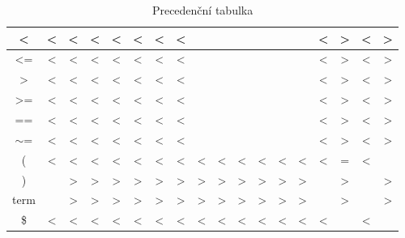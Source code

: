 \documentclass[11pt,a4paper]{article}
\begin{document}
\begin{table}[h!]
\begin{tabular}{|c|c|c|c|c|c|c|c|c|c|c|c|c|c|c|c|c|c|}
            \textless{} & \textless{} & \textless{} & \textless{} & \textless{} & \textless{} & \textless{} & \textless{} &  &  &  &  &  &  & \textless{} & \textgreater{} & \textless{} & \textgreater{} \\ \hline
            \textless{}= & \textless{} & \textless{} & \textless{} & \textless{} & \textless{} & \textless{} & \textless{} &  &  &  &  &  &  & \textless{} & \textgreater{} & \textless{} & \textgreater{} \\ \hline
            \textgreater{} & \textless{} & \textless{} & \textless{} & \textless{} & \textless{} & \textless{} & \textless{} &  &  &  &  &  &  & \textless{} & \textgreater{} & \textless{} & \textgreater{} \\ \hline
            \textgreater{}= & \textless{} & \textless{} & \textless{} & \textless{} & \textless{} & \textless{} & \textless{} &  &  &  &  &  &  & \textless{} & \textgreater{} & \textless{} & \textgreater{} \\ \hline
            == & \textless{} & \textless{} & \textless{} & \textless{} & \textless{} & \textless{} & \textless{} &  &  &  &  &  &  & \textless{} & \textgreater{} & \textless{} & \textgreater{} \\ \hline
            $\sim$= & \textless{} & \textless{} & \textless{} & \textless{} & \textless{} & \textless{} & \textless{} &  &  &  &  &  &  & \textless{} & \textgreater{} & \textless{} & \textgreater{} \\ \hline
            ( & \textless{} & \textless{} & \textless{} & \textless{} & \textless{} & \textless{} & \textless{} & \textless{} & \textless{} & \textless{} & \textless{} & \textless{} & \textless{} & \textless{} & = & \textless{} &  \\ \hline
            ) &  & \textgreater{} & \textgreater{} & \textgreater{} & \textgreater{} & \textgreater{} & \textgreater{} & \textgreater{} & \textgreater{} & \textgreater{} & \textgreater{} & \textgreater{} & \textgreater{} &  & \textgreater{} &  & \textgreater{} \\ \hline
            term &  & \textgreater{} & \textgreater{} & \textgreater{} & \textgreater{} & \textgreater{} & \textgreater{} & \textgreater{} & \textgreater{} & \textgreater{} & \textgreater{} & \textgreater{} & \textgreater{} &  & \textgreater{} &  & \textgreater{} \\ \hline
            \$ & \textless{} & \textless{} & \textless{} & \textless{} & \textless{} & \textless{} & \textless{} & \textless{} & \textless{} & \textless{} & \textless{} & \textless{} & \textless{} & \textless{} &  & \textless{} &  \\ \hline
            \end{tabular}
            \caption{Precedenční tabulka}
            \label{tab:prec-tab}
        \end{table}
    
\end{document}
